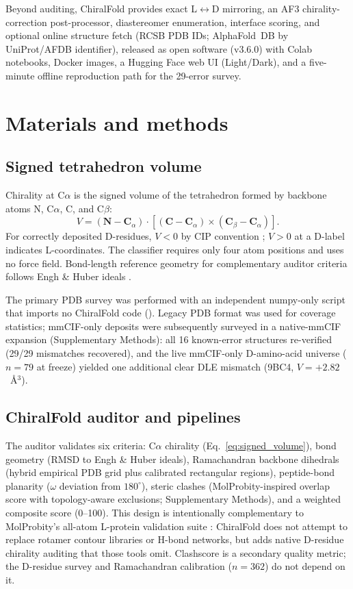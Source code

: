 \documentclass[numsec,webpdf,modern,large,namedate]{oup-authoring-template}
\DeclareRobustCommand{\repopath}[1]{\path{#1}}
\begin{document}
Beyond auditing, ChiralFold provides exact L$\leftrightarrow$D mirroring, an AF3 chirality-correction post-processor, diastereomer enumeration, interface scoring, and optional online structure fetch (RCSB PDB IDs; AlphaFold~DB by UniProt/AFDB identifier), released as open software (v3.6.0) with Colab notebooks, Docker images, a Hugging Face web UI (Light/Dark), and a five-minute offline reproduction path for the 29-error survey.

\section{Materials and methods}

\subsection{Signed tetrahedron volume}

Chirality at C$\alpha$ is the signed volume of the tetrahedron formed by backbone atoms N, C$\alpha$, C, and C$\beta$:
\begin{equation}
V = (\mathbf{N}-\mathbf{C}_\alpha)\cdot\left[(\mathbf{C}-\mathbf{C}_\alpha)\times(\mathbf{C}_\beta-\mathbf{C}_\alpha)\right].
\label{eq:signed_volume}
\end{equation}
For correctly deposited D-residues, $V<0$ by CIP convention \citep{cip2013}; $V>0$ at a D-label indicates L-coordinates. The classifier requires only four atom positions and uses no force field. Bond-length reference geometry for complementary auditor criteria follows Engh \& Huber ideals \citep{engh1991}.

The primary PDB survey was performed with an independent numpy-only script that imports no ChiralFold code (\repopath{benchmarks/independent_d_residue_verification.py}). Legacy PDB format was used for coverage statistics; mmCIF-only deposits were subsequently surveyed in a native-mmCIF expansion (Supplementary Methods): all 16 known-error structures re-verified (29/29 mismatches recovered), and the live mmCIF-only D-amino-acid universe ($n=79$ at freeze) yielded one additional clear DLE mismatch (9BC4, $V=+2.82$~\AA$^3$).

\subsection{ChiralFold auditor and pipelines}

The auditor validates six criteria: C$\alpha$ chirality (Eq.~\ref{eq:signed_volume}), bond geometry (RMSD to Engh \& Huber ideals), Ramachandran backbone dihedrals (hybrid empirical PDB grid plus calibrated rectangular regions), peptide-bond planarity ($\omega$ deviation from $180^\circ$), steric clashes (MolProbity-inspired overlap score with topology-aware exclusions; Supplementary Methods), and a weighted composite score (0--100). This design is intentionally complementary to MolProbity's all-atom L-protein validation suite \citep{chen2010,williams2018}: ChiralFold does not attempt to replace rotamer contour libraries or H-bond networks, but adds native D-residue chirality auditing that those tools omit. Clashscore is a secondary quality metric; the D-residue survey and Ramachandran calibration ($n=362$) do not depend on it.
\end{document}

